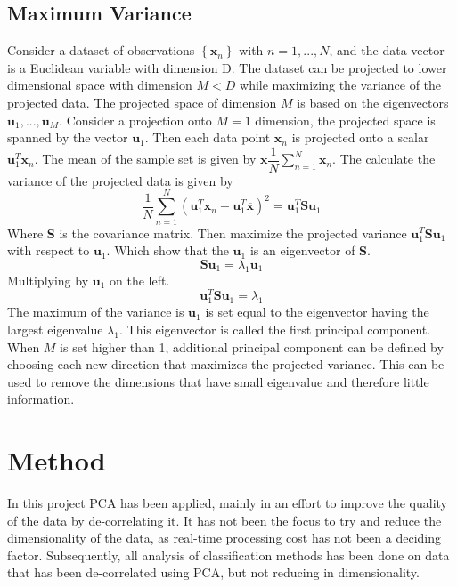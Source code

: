 \subsection{Maximum Variance}
Consider a dataset of observations $ \left\lbrace \mathbf{x}_n \right\rbrace $ with $ n = 1,...,N $, and the data vector is a Euclidean variable with dimension D. 
The dataset can be projected to lower dimensional space with dimension $ M<D $ 	while maximizing the variance of the projected data. 
The projected space of dimension $ M $ is based on the eigenvectors $ \mathbf{u}_1, ..., \mathbf{u}_M $.
Consider a projection onto $ M=1 $ dimension, the projected space is spanned by the vector $ \mathbf{u}_1 $. 
Then each data point $ \mathbf{x}_n $ is projected onto a scalar $ \mathbf{u}_1^T \mathbf{x}_n $. The mean of the sample set is given by $ \overline{\mathbf{x}} \dfrac{1}{N}\sum_{n=1}^{N} \mathbf{x}_n $.
The calculate the variance of the projected data is given by
\begin{equation}
\dfrac{1}{N}\sum_{n=1}^{N}\left(\mathbf{u}_1^T \mathbf{x}_n-\mathbf{u}_1^T \overline{\mathbf{x}} \right)^2 = \mathbf{u}_1^T \mathbf{S} \mathbf{u}_1
\end{equation}
Where \textbf{S} is the covariance matrix. 
Then maximize the projected variance $ \mathbf{u}_1^T \mathbf{S} \mathbf{u}_1 $ with respect to $ \mathbf{u}_1 $.
Which show that the $ \mathbf{u}_1 $ is an eigenvector of \textbf{S}.
\begin{equation}
\mathbf{S}\mathbf{u}_1 = \lambda_1 \mathbf{u}_1
\end{equation}
Multiplying by $ \mathbf{u}_1 $ on the left.
\begin{equation}
\mathbf{u}_1^T \mathbf{S}\mathbf{u}_1 = \lambda_1
\end{equation}
The maximum of the variance is $ \mathbf{u}_1 $ is set equal to the eigenvector having the largest eigenvalue $ \lambda_1 $.
This eigenvector is called the first principal component. 
When $ M $ is set higher than 1, additional principal component can be defined by choosing each new direction that maximizes the projected variance.
This can be used to remove the dimensions that have small eigenvalue and therefore little information.         


\section{Method}
In this project PCA has been applied, mainly in an effort to improve the quality of the data by de-correlating it.
It has not been the focus to try and reduce the dimensionality of the data, as real-time processing cost has not been a deciding factor.
Subsequently, all analysis of classification methods has been done on data that has been de-correlated using PCA, but not reducing in dimensionality.

